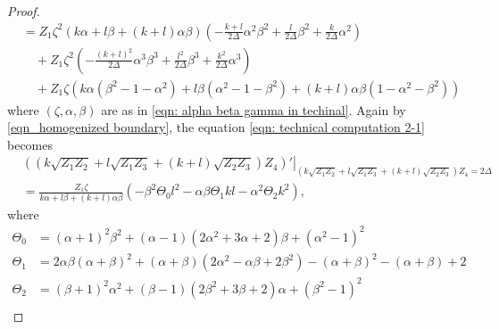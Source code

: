 \documentclass[11pt,letterpaper]{amsart}
\theoremstyle{definition}
\numberwithin{equation}{section}
\begin{document}
\begin{proof}
\begin{equation}
\begin{split}
&=Z_1\zeta^2(k\alpha+l\beta+(k+l)\alpha\beta)\left(-\frac{k+l}{2\Delta}\alpha^2\beta^2+\frac{l}{2\Delta}\beta^2+\frac{k}{2\Delta}\alpha^2\right)\\
&\quad +Z_1\zeta^2\left(-\frac{(k+l)^2}{2\Delta}\alpha^3\beta^3+\frac{l^2}{2\Delta}\beta^3+\frac{k^2}{2\Delta}\alpha^3\right)\\
&\quad +Z_1\zeta(k\alpha(\beta^2-1-\alpha^2)+l\beta(\alpha^2-1-\beta^2)+(k+l)\alpha\beta(1-\alpha^2-\beta^2))
\end{split}
\end{equation}
where $(\zeta,\alpha,\beta)$ are as in \eqref{eqn: alpha beta gamma in techinal}. Again by \eqref{eqn_homogenized boundary}, the equation \eqref{eqn: technical computation 2-1} becomes
\begin{equation}
\label{eqn: technical computation 2-2}
\begin{split}
&\left.\left(\left(k\sqrt{Z_1Z_2}+l\sqrt{Z_1Z_3}+(k+l)\sqrt{Z_2Z_3}\right)Z_4\right)'\right|_{\left(k\sqrt{Z_1Z_2}+l\sqrt{Z_1Z_3}+(k+l)\sqrt{Z_2Z_3}\right)Z_4=2\Delta}
\\
&=\frac{Z_1\zeta}{k\alpha+l\beta+(k+l)\alpha\beta}(-\beta^2\Theta_0 l^2-\alpha\beta\Theta_1kl-\alpha^2\Theta_2k^2),
\end{split}
\end{equation}
where
\begin{equation}
\begin{split}
\Theta_0&=(\alpha+1)^2 \beta^2+(\alpha-1)(2\alpha^2+3\alpha+2) \beta+( \alpha^2-1)^2\\
\Theta_1&=2\alpha\beta (\alpha+\beta)^2 + (\alpha+\beta)(2\alpha^2-\alpha\beta+2\beta^2) - (\alpha+\beta)^2 - ( \alpha +  \beta) + 2\\
\Theta_2&=(\beta+1)^2\alpha^2+(\beta-1)(2\beta^2+3\beta+2)\alpha+(\beta^2-1)^2\\
\end{split}
\end{equation}


\end{proof}
\end{document}
